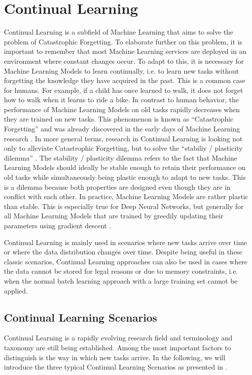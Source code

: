 \section{Continual Learning}
\label{sec:ContinualLearning}
Continual Learning is a subfield of Machine Learning that aims to solve the problem of Catastrophic Forgetting. To elaborate further on this problem,
it is important to remember that most Machine Learning services are deployed in an environment where constant changes occur. To adapt to this, it is
necessary for Machine Learning Models to learn continually, i.e. to learn new tasks without forgetting the knowledge they have acquired in the past.
This is a common case for humans. For example, if a child has once learned to walk, it does not forget how to walk when it learns to ride a bike.
In contrast to human behavior, the performance of Machine Learning Models on old tasks rapidly decreases when they are trained on new tasks. This phenomenon
is known as \enquote{Catastrophic Forgetting} and was already discovered in the early days of Machine Learning research \cite{mccloskey1989catastrophic}.
In more general terms, research in Continual Learning is looking not only to alleviate Catastrophic Forgetting, but to solve the 
\enquote{stabiliy / plasticity dilemma} \cite{carpenter1988art}. The stability / plasticity dilemma refers to the fact that Machine Learning Models
should ideally be stable enough to retain their performance on old tasks while simultaneously being plastic enough to adapt to new tasks. This is a dilemma
because both properties are designed even though they are in conflict with each other. In practice, Machine Learning Models are rather plastic than stable.
This is especially true for Deep Neural Networks, but generally for all Machine Learning Models that are trained by greedily updating their parameters using
gradient descent \cite{mundt2020wholistic}. \par
Continual Learning is mainly used in scenarios where new tasks arrive over time or where the data distribution changes over time. Despite being useful
in these classic scenarios, Continual Learning approaches can also be used in cases where the data cannot be stored for legal reasons or due to memory
constraints, i.e. when the normal batch learning approach with a large training set cannot be applied. 


\subsection{Continual Learning Scenarios}
\label{sec:ContinualLearningScenarios}
Continual Learning is a rapidly evolving research field and terminology and taxonomy are still being established. Among the most important factors to distinguish
is the way in which new tasks arrive. In the following, we will introduce the three typical Continual Learning Scenarios as presented in \cite{van2022three}. 

